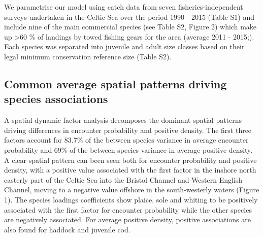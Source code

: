 \documentclass{nature}
\begin{document}
\begin{linenumbers}
We parametrise our  model using catch data from seven
fisheries-independent surveys undertaken in the Celtic Sea over the period 1990
- 2015 (Table S1) and include nine of the main commercial species (see Table
S2, Figure 2)  which make up \textgreater 60 \% of landings by towed fishing gears for the
area (average 2011 - 2015;\cite{STECF2017}). Each species was separated into
juvenile and adult size classes based on their legal minimum conservation
reference size (Table S2).


\subsection{Common average spatial patterns driving species associations} A
spatial dynamic factor analysis decomposes the dominant spatial patterns
driving differences in encounter probability and positive density. The first
three factors  account for 83.7\% of the between
species variance in average encounter probability and 69\% of the
between species variance in average positive density. A clear spatial
pattern can been seen both for encounter probability and positive density, with
a positive value associated with the first factor in the inshore north easterly
part of the Celtic Sea into the Bristol Channel and Western English Channel,
moving to a negative value offshore in the south-westerly waters (Figure 1).
The species loadings coefficients show plaice, sole and whiting to be
positively associated with the first factor for encounter probability while the
other species are negatively associated. For average positive density,
positive associations are also found for haddock and juvenile cod.  


\end{linenumbers}
\end{document}
